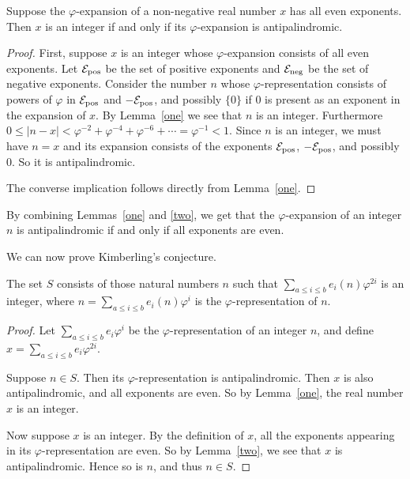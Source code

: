 \documentclass[12pt,reqno]{article}
\begin{document}
\begin{lemma}
Suppose the $\varphi$-expansion of a non-negative real number $x$ has all even exponents.   Then $x$ is an integer if and only if its $\varphi$-expansion is antipalindromic.
\label{two}
\end{lemma}

\begin{proof}
First, suppose $x$ is an integer whose $\varphi$-expansion consists of all even exponents.   Let ${\cal E}_{\text{pos}}$ be the set of positive exponents and
${\cal E}_{\text{neg}}$ be the set of negative exponents.  Consider the number
$n$ whose $\varphi$-representation
consists of powers of $\varphi$ in ${\cal E}_{\text{pos}}$ and
$-{\cal E}_{\text{pos}}$, and possibly $\{0\}$ if $0$ is present as an exponent in the expansion of $x$.  By Lemma~\ref{one} we see that $n$ is an integer.   Furthermore
$0 \leq |n - x| < \varphi^{-2} + \varphi^{-4} + \varphi^{-6} + \cdots = \varphi^{-1} < 1$.
Since $n$ is an integer, we must
have $n = x$ and its expansion
consists of the exponents ${\cal E}_{\text{pos}}$,
$-{\cal E}_{\text{pos}}$, and possibly $0$.  So it is antipalindromic.

The converse implication follows directly from Lemma~\ref{one}.
\end{proof}

\begin{remark}
By combining Lemmas~\ref{one} and \ref{two}, we get that the $\varphi$-expansion of an integer $n$ is antipalindromic if and only if all exponents are even.
\end{remark}

We can now prove Kimberling's conjecture.
\begin{theorem}
The set $S$ consists of those natural numbers
$n$ such that
$\sum_{a \leq i \leq b} e_i(n) \varphi^{2i}$
is an integer,
where $n = \sum_{a \leq i \leq b} e_i(n) \varphi^i$ is the 
$\varphi$-representation of $n$.
\end{theorem}

\begin{proof}
Let $\sum_{a \leq i \leq b} e_i \varphi^i$ be the $\varphi$-representation of an integer $n$, and define
$x = \sum_{a \leq i \leq b} e_i \varphi^{2i}$.

Suppose $n \in S$.  Then its $\varphi$-representation is antipalindromic. Then $x$ is also 
antipalindromic, and all exponents
are even.  So by Lemma~\ref{one}, the real number $x$ is an integer.

Now suppose $x$ is an integer.  By the definition of $x$, all the exponents appearing in its $\varphi$-representation are even.  So by Lemma~\ref{two}, we see that $x$ is antipalindromic.  Hence so is $n$, and thus $n \in S$.
\end{proof}
\end{document}
